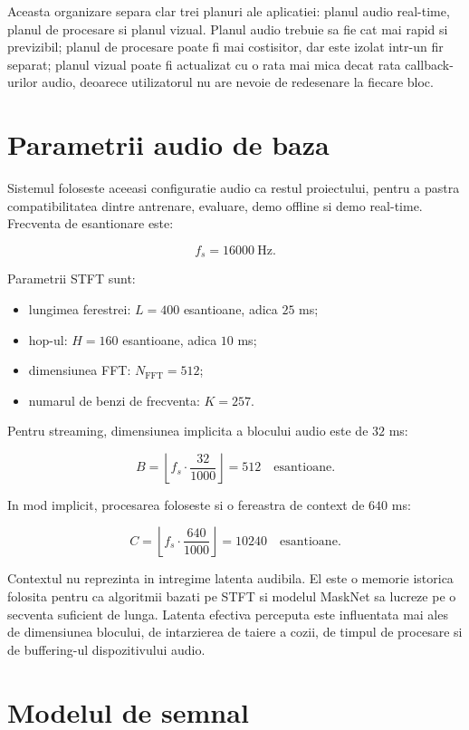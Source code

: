Aceasta organizare separa clar trei planuri ale aplicatiei: planul audio
real-time, planul de procesare si planul vizual. Planul audio trebuie sa fie
cat mai rapid si previzibil; planul de procesare poate fi mai costisitor, dar
este izolat intr-un fir separat; planul vizual poate fi actualizat cu o rata
mai mica decat rata callback-urilor audio, deoarece utilizatorul nu are nevoie
de redesenare la fiecare bloc.

\section{Parametrii audio de baza}

Sistemul foloseste aceeasi configuratie audio ca restul proiectului, pentru a
pastra compatibilitatea dintre antrenare, evaluare, demo offline si demo
real-time. Frecventa de esantionare este:

\[
f_s = 16000 \ \text{Hz}.
\]

Parametrii STFT sunt:

\begin{itemize}
    \item lungimea ferestrei: \(L = 400\) esantioane, adica \(25\) ms;
    \item hop-ul: \(H = 160\) esantioane, adica \(10\) ms;
    \item dimensiunea FFT: \(N_{\text{FFT}} = 512\);
    \item numarul de benzi de frecventa: \(K = 257\).
\end{itemize}

Pentru streaming, dimensiunea implicita a blocului audio este de \(32\) ms:

\[
B = \left\lfloor f_s \cdot \frac{32}{1000} \right\rfloor = 512
\quad \text{esantioane}.
\]

In mod implicit, procesarea foloseste si o fereastra de context de \(640\) ms:

\[
C = \left\lfloor f_s \cdot \frac{640}{1000} \right\rfloor = 10240
\quad \text{esantioane}.
\]

Contextul nu reprezinta in intregime latenta audibila. El este o memorie
istorica folosita pentru ca algoritmii bazati pe STFT si modelul MaskNet sa
lucreze pe o secventa suficient de lunga. Latenta efectiva perceputa este
influentata mai ales de dimensiunea blocului, de intarzierea de taiere a cozii,
de timpul de procesare si de buffering-ul dispozitivului audio.

\section{Modelul de semnal}

